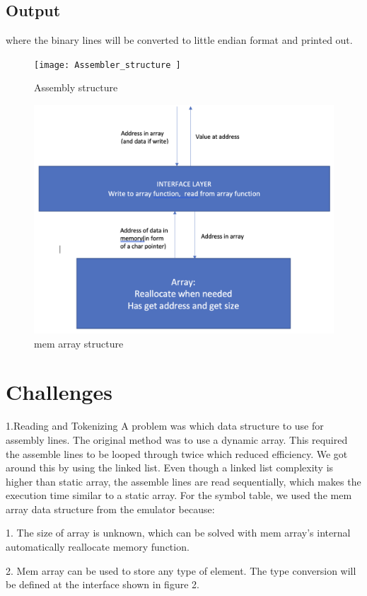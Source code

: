\documentclass{article}
\begin{document}
\subsection{Output}
    where the binary lines will be converted to little endian format and printed out.
\begin{figure}
\centering
\begin{minipage}{.5\textwidth}
\centering
\texttt{[image:  Assembler\_structure ]}
\caption{Assembly structure}
\label{fig:assembly}
\end{minipage}\hfill
\begin{minipage}{.5\textwidth}
\centering
\includegraphics[width = \linewidth]{ mem_array }
\caption{mem array structure}
\label{fig:mem_array}
\end{minipage}
\end{figure}


\section{Challenges}
1.Reading and Tokenizing\newline
    A problem was which data structure to use for assembly lines. The original method was to use a dynamic array. This required the assemble lines to be looped through twice which reduced efficiency. We got around this by using the linked list. Even though a linked list complexity is higher than static array, the assemble lines are read sequentially, which makes the execution time similar to a static array.\newline\newline
    For the symbol table, we used the mem array data structure from the emulator because:
    
    1. The size of array is unknown, which can be solved with mem array's internal automatically reallocate memory function.
    
    2. Mem array can be used to store any type of element. The type conversion will be defined at the interface shown in figure 2.
\end{document}

